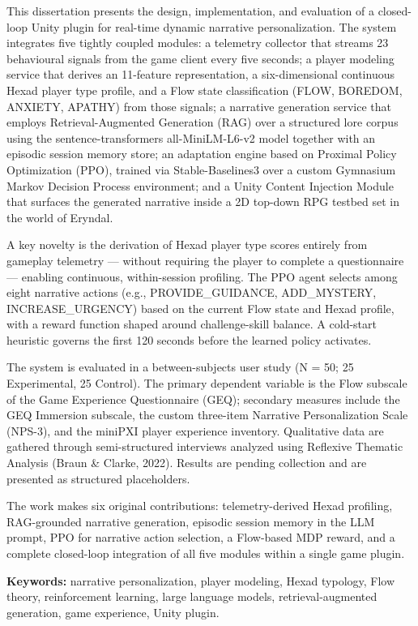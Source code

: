 This dissertation presents the design, implementation, and evaluation of
a closed-loop Unity plugin for real-time dynamic narrative
personalization. The system integrates five tightly coupled modules: a
telemetry collector that streams 23 behavioural signals from the game
client every five seconds; a player modeling service that derives an
11-feature representation, a six-dimensional continuous Hexad player
type profile, and a Flow state classification (FLOW, BOREDOM, ANXIETY,
APATHY) from those signals; a narrative generation service that employs
Retrieval-Augmented Generation (RAG) over a structured lore corpus using
the sentence-transformers all-MiniLM-L6-v2 model together with an
episodic session memory store; an adaptation engine based on Proximal
Policy Optimization (PPO), trained via Stable-Baselines3 over a custom
Gymnasium Markov Decision Process environment; and a Unity Content
Injection Module that surfaces the generated narrative inside a 2D
top-down RPG testbed set in the world of Eryndal.

A key novelty is the derivation of Hexad player type scores entirely
from gameplay telemetry --- without requiring the player to complete a
questionnaire --- enabling continuous, within-session profiling. The PPO
agent selects among eight narrative actions (e.g., PROVIDE\_GUIDANCE,
ADD\_MYSTERY, INCREASE\_URGENCY) based on the current Flow state and
Hexad profile, with a reward function shaped around challenge-skill
balance. A cold-start heuristic governs the first 120 seconds before the
learned policy activates.

The system is evaluated in a between-subjects user study (N = 50; 25
Experimental, 25 Control). The primary dependent variable is the Flow
subscale of the Game Experience Questionnaire (GEQ); secondary measures
include the GEQ Immersion subscale, the custom three-item Narrative
Personalization Scale (NPS-3), and the miniPXI player experience
inventory. Qualitative data are gathered through semi-structured
interviews analyzed using Reflexive Thematic Analysis (Braun \& Clarke,
2022). Results are pending collection and are presented as structured
placeholders.

The work makes six original contributions: telemetry-derived Hexad
profiling, RAG-grounded narrative generation, episodic session memory in
the LLM prompt, PPO for narrative action selection, a Flow-based MDP
reward, and a complete closed-loop integration of all five modules
within a single game plugin.

\textbf{Keywords:} narrative personalization, player modeling, Hexad
typology, Flow theory, reinforcement learning, large language models,
retrieval-augmented generation, game experience, Unity plugin.


